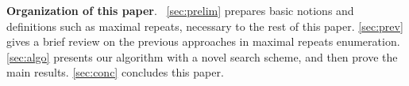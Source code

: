 \textbf{Organization of this paper}.\ 
\cref{sec:prelim} prepares basic notions and definitions such as maximal repeats, necessary to the rest of this paper. \cref{sec:prev} gives a brief review on the previous approaches in maximal repeats enumeration. \cref{sec:algo} presents our algorithm with a novel search scheme, and then prove the main results.
\cref{sec:conc} concludes this paper. 

